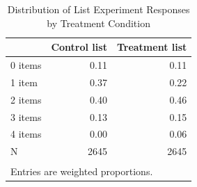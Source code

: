 \begin{table}[!h]
\centering
\caption{\label{tab:list_response_distribution}Distribution of List Experiment Responses by Treatment Condition}
\centering
\begin{tabular}[t]{lrr}
\toprule
 & Control list & Treatment list\\
\midrule
0 items & 0.11 & 0.11\\
1 item & 0.37 & 0.22\\
2 items & 0.40 & 0.46\\
3 items & 0.13 & 0.15\\
4 items & 0.00 & 0.06\\
\addlinespace
N & 2645 & 2645\\
\bottomrule
\multicolumn{3}{l}{\textsuperscript{} Entries are weighted proportions.}\\
\end{tabular}
\end{table}
